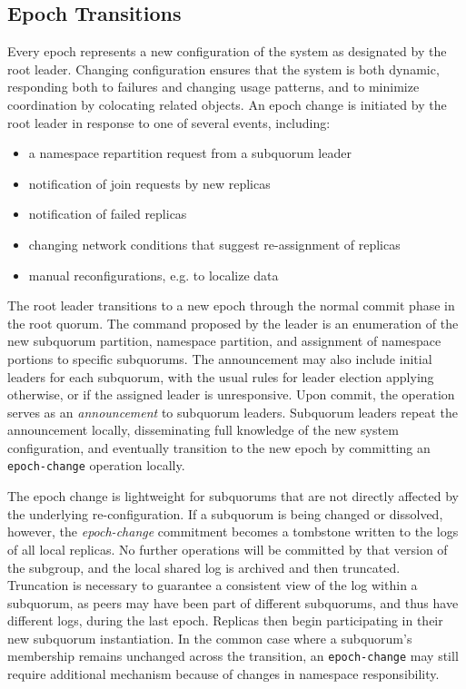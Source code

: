 \subsection{Epoch Transitions}
\label{ch03_epoch_transitions}


Every epoch represents a new configuration of the system as designated by the root leader.
Changing configuration ensures that the system is both dynamic, responding both to failures and changing usage patterns, and to minimize coordination by colocating related objects.
An epoch change is initiated by the root leader in response to one of several events, including:

\renewcommand{\baselinestretch}{1}
\begin{itemize}
    \item a namespace repartition request from a subquorum leader
    \item notification of join requests by new replicas
    \item notification of failed replicas
    \item changing network conditions that suggest re-assignment of replicas
    \item manual reconfigurations, e.g. to localize data
\end{itemize}
\renewcommand{\baselinestretch}{2}

The root leader transitions to a new epoch through the normal commit phase in the root quorum.
The command proposed by the leader is an enumeration of the new subquorum partition, namespace partition, and assignment of namespace portions to specific subquorums.
The announcement may also include initial leaders for each subquorum, with the usual rules for leader election applying otherwise, or if the assigned leader is unresponsive.
Upon commit, the operation serves as an \emph{announcement} to subquorum leaders.
Subquorum leaders repeat the announcement locally, disseminating full knowledge of the new system configuration, and eventually transition to the new epoch by committing an \texttt{epoch-change} operation locally.

The epoch change is lightweight for subquorums that are not directly affected by the underlying re-configuration.
If a subquorum is being changed or dissolved, however, the \emph{epoch-change} commitment becomes a tombstone written to the logs of all local replicas.
No further operations will be committed by that version of the subgroup, and the local shared log is archived and then truncated.
Truncation is necessary to guarantee a consistent view of the log within a subquorum, as peers may have been part of different subquorums, and thus have different logs, during the last epoch.
Replicas then begin participating in their new subquorum instantiation.
In the common case where a subquorum's membership remains unchanged across the transition, an \texttt{epoch-change} may still require additional mechanism because of changes in namespace responsibility.

